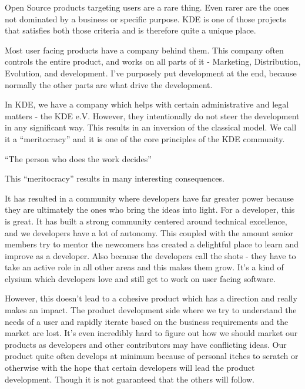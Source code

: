 


\noindent{}Open Source products targeting users are a rare thing. Even rarer are the ones not dominated by a business or specific purpose. KDE is one of those projects that satisfies both those criteria and is therefore quite a unique place.

Most user facing products have a company behind them. This company often controls the entire product, and works on all parts of it - Marketing, Distribution, Evolution, and development. I’ve purposely put development at the end, because normally the other parts are what drive the development.

In KDE, we have a company which helps with certain administrative and legal matters - the KDE e.V. However, they intentionally do not steer the development in any significant way. This results in an inversion of the classical model. We call it a “meritocracy” and it is one of the core principles of the KDE community.

“The person who does the work decides”

This “meritocracy” results in many interesting consequences.

It has resulted in a community where developers have far greater power because they are ultimately the ones who bring the ideas into light. For a developer, this is great. It has built a strong community centered around technical excellence, and we developers have a lot of autonomy. This coupled with the amount senior members try to mentor the newcomers has created a delightful place to learn and improve as a developer. Also because the developers call the shots - they have to take an active role in all other areas and this makes them grow. It’s a kind of elysium which developers love and still get to work on user facing software.

However, this doesn’t lead to a cohesive product which has a direction and really makes an impact. The product development side where we try to understand the needs of a user and rapidly iterate based on the business requirements and the market are lost. It’s even incredibly hard to figure out how we should market our products as developers and other contributors may have conflicting ideas. Our product quite often develops at minimum because of personal itches to scratch or otherwise with the hope that certain developers will lead the product development. Though it is not guaranteed that the others will follow.

